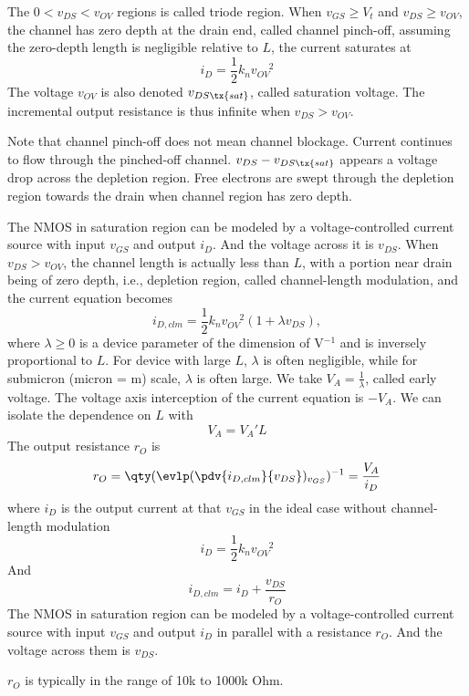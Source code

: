 \documentclass[a4paper,12pt]{report}
\begin{document}
The $0<v_{DS}<v_{OV}$ regions is called triode region.
When $v_{GS}\ge V_t$ and $v_{DS}\ge v_{OV}$, the channel has zero depth at the drain end, called channel pinch-off, assuming the zero-depth length is negligible relative to $L$, the current saturates at
\[i_D=\frac{1}{2}k_nv_{OV}^{\phantom{OV}2}\]
The voltage $v_{OV}$ is also denoted $v_{DS\tx{sat}}$, called saturation voltage. The incremental output resistance is thus infinite when $v_{DS}>v_{OV}$.

Note that channel pinch-off does not mean channel blockage. Current continues to flow through the pinched-off channel. $v_{DS}-v_{DS\tx{sat}}$ appears a voltage drop across the depletion region. Free electrons are swept through the depletion region towards the drain when channel region has zero depth.

The NMOS in saturation region can be modeled by a voltage-controlled current source with input $v_{GS}$ and output $i_D$. And the voltage across it is $v_{DS}$.
When $v_{DS}>v_{OV}$, the channel length is actually less than $L$, with a portion near drain being of zero depth, i.e., depletion region, called channel-length modulation, and the current equation becomes
\[i_{D,clm}=\frac{1}{2}k_nv_{OV}^{\phantom{OV}2}(1+\lambda v_{DS}),\]
where $\lambda\ge 0$ is a device parameter of the dimension of V$^{-1}$ and is inversely proportional to $L$. For device with large $L$, $\lambda$ is often negligible, while for submicron (micron = \textmu{}m) scale, $\lambda$ is often large. We take $V_A=\frac{1}{\lambda}$, called early voltage. The voltage axis interception of the current equation is $-V_A$.  We can isolate the dependence on $L$ with
\[V_A=V_A'L\]
The output resistance $r_O$ is
\[r_O=\qty(\evlp(\pdv{i_{D,clm}}{v_{DS}})_{v_{GS}})^{-1}=\frac{V_A}{i_D}\]
where $i_D$ is the output current at that $v_{GS}$ in the ideal case without channel-length modulation
\[i_D=\frac{1}{2}k_nv_{OV}^{\phantom{OV}2}\]
And
\[i_{D,clm}=i_D+\frac{v_{DS}}{r_O}\]
The NMOS in saturation region can be modeled by a voltage-controlled current source with input $v_{GS}$ and output $i_D$ in parallel with a resistance $r_O$. And the voltage across them is $v_{DS}$.

$r_O$ is typically in the range of 10k to 1000k Ohm.
\end{document}
